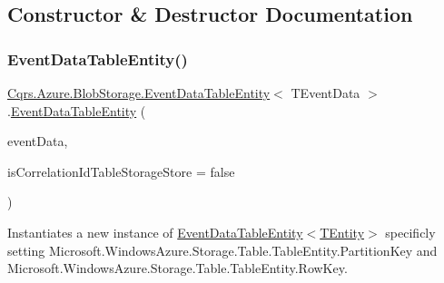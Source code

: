 \subsection{Constructor \& Destructor Documentation}
\mbox{\label{classCqrs_1_1Azure_1_1BlobStorage_1_1EventDataTableEntity_a90c39733d651a5a71497909089e67c1a_a90c39733d651a5a71497909089e67c1a}} 
\subsubsection{\texorpdfstring{Event\+Data\+Table\+Entity()}{EventDataTableEntity()}\hspace{0.1cm}{\footnotesize\ttfamily [1/2]}}
{\footnotesize\ttfamily \hyperlink{classCqrs_1_1Azure_1_1BlobStorage_1_1EventDataTableEntity}{Cqrs.\+Azure.\+Blob\+Storage.\+Event\+Data\+Table\+Entity}$<$ T\+Event\+Data $>$.\hyperlink{classCqrs_1_1Azure_1_1BlobStorage_1_1EventDataTableEntity}{Event\+Data\+Table\+Entity} (\begin{DoxyParamCaption}\item[{T\+Event\+Data}]{event\+Data,  }\item[{bool}]{is\+Correlation\+Id\+Table\+Storage\+Store = {\ttfamily false} }\end{DoxyParamCaption})}



Instantiates a new instance of \hyperlink{classCqrs_1_1Azure_1_1BlobStorage_1_1EventDataTableEntity_a90c39733d651a5a71497909089e67c1a_a90c39733d651a5a71497909089e67c1a}{Event\+Data\+Table\+Entity$<$\+T\+Entity$>$} specificly setting Microsoft.\+Windows\+Azure.\+Storage.\+Table.\+Table\+Entity.\+Partition\+Key and Microsoft.\+Windows\+Azure.\+Storage.\+Table.\+Table\+Entity.\+Row\+Key. 

\mbox{\label{classCqrs_1_1Azure_1_1BlobStorage_1_1EventDataTableEntity_a6785ad2dd88c6db1ec4a2d8d474b557d_a6785ad2dd88c6db1ec4a2d8d474b557d}} 
